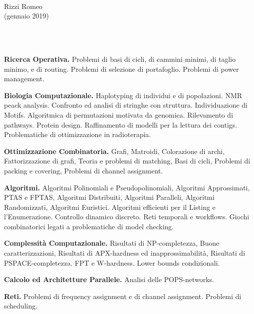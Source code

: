 \documentclass[10pt]{article}
\newcommand{\voice}[1] { \bigskip \medskip \noindent {\Large \bf #1} \medskip\\ }
\begin{document}
\mbox{\ }
\vspace{-2cm} 
\begin{center}
{\Huge {}
               Rizzi Romeo}\\ \vspace{4mm}
               (gennaio 2019)
\end{center}

\mbox{\ }
\vspace{-0.1cm}

\voice{{\LARGE Interessi ed Aree di Ricerca}}

{\bf Ricerca Operativa.}
    Problemi di basi di cicli, di cammini minimi, di taglio minimo, e di routing.
    Problemi di selezione di portafoglio.
    Problemi di power management.

{\bf Biologia Computazionale.}
    Haplotyping di individui e di popolazioni.
    NMR peack analysis.
    Confronto ed analisi di stringhe con struttura.
    Individuazione di Motifs.
    Algoritmica di permutazioni motivata da genomica.
    Rilevamento di pathways.
    Protein design.
    Raffinamento di modelli per la lettura dei contigs.
    Problematiche di ottimizzazione in radioterapia. 

{\bf Ottimizzazione Combinatoria.}
    Grafi,
    Matroidi,
    Colorazione di archi,
    Fattorizzazione di grafi,
    Teoria e problemi di matching,
    Basi di cicli,
    Problemi di packing e covering,
    Problemi di channel assignment.

{\bf Algoritmi.}
    Algoritmi Polinomiali e Pseudopolinomiali,
    Algoritmi Approssimati,
    PTAS e FPTAS,
    Algoritmi Distribuiti,
    Algoritmi Paralleli,
    Algoritmi Randomizzati,
    Algoritmi Euristici.
    Algoritmi efficienti per il Listing e l'Enumerazione.
    Controllo dinamico discreto.
    Reti temporali e workflows.
    Giochi combinatorici legati a problematiche di model checking.

{\bf Complessit\`a Computazionale.}
    Risultati di NP-completezza,
    Buone caratterizzazioni,
    Risultati di APX-hardness ed inapprossimabilit\`a,
    Risultati di PSPACE-completezza.
    FPT e W-hardness.
    Lower bounds condizionali.

{\bf Calcolo ed Architetture Parallele.}
    Analisi delle POPS-networks.

{\bf Reti.}
    Problemi di frequency assignment e di channel assignment.
    Problemi di scheduling.\\
\end{document}
